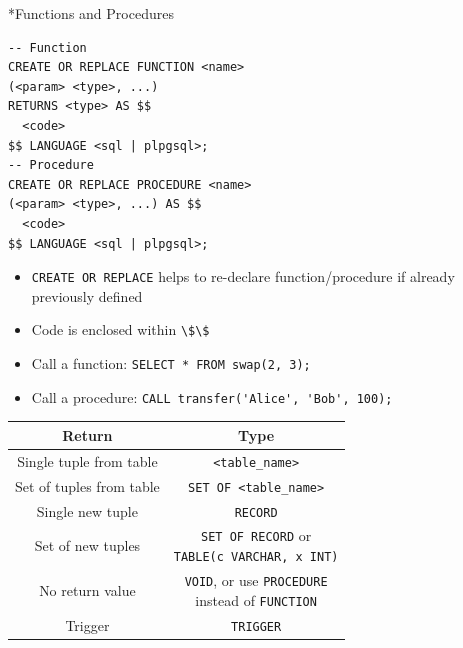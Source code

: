 \documentclass[a4paper]{article}
\makeatletter
\newcommand{\uppercaseandunderline}[1]{\uline{\uppercase{#1}}}
\renewcommand{\section}{
  \@startsection{section}{1}{0pt}{1ex}{1ex} {\raggedleft\normalfont\normalsize\bfseries\uppercaseandunderline}}
\newcommand{\ic}[1]{\lstinline{#1}}
\makeatother
\begin{document}
\begin{multicols}{2}
\section*{Functions and Procedures} \noindent
    \begin{minipage}{0.57\columnwidth}
      \begin{lstlisting}
-- Function
CREATE OR REPLACE FUNCTION <name>
(<param> <type>, ...)
RETURNS <type> AS $$
  <code>
$$ LANGUAGE <sql | plpgsql>;
-- Procedure
CREATE OR REPLACE PROCEDURE <name>
(<param> <type>, ...) AS $$
  <code>
$$ LANGUAGE <sql | plpgsql>;
      \end{lstlisting}
    \end{minipage}
    \begin{minipage}{0.40\columnwidth}
      \begin{itemize}[leftmargin=*]
        \item \ic{CREATE OR REPLACE} helps to re-declare function/procedure if already previously defined
        \item Code is enclosed within \ic{\$\$}
        \item Call a function: \ic{SELECT * FROM swap(2, 3);}
        \item Call a procedure: \ic{CALL transfer('Alice', 'Bob', 100);}
      \end{itemize}
    \end{minipage}
    \begin{center}
      \begin{tabular}{ |c|c| }
        \hline
        \textbf{Return} & \textbf{Type} \\ \hline
        Single tuple from table & \ic{<table_name>} \\ \hline
        Set of tuples from table & \ic{SET OF <table_name>} \\ \hline
        Single new tuple & \ic{RECORD} \\ \hline
        Set of new tuples & \makecell{ \ic{SET OF RECORD} or \\ \ic{TABLE(c VARCHAR, x INT)} } \\ \hline
        No return value & \makecell{ \ic{VOID}, or use \ic{PROCEDURE} \\ instead of \ic{FUNCTION} } \\ \hline
        Trigger & \ic{TRIGGER} \\ \hline
      \end{tabular}
    \end{center}
    \begin{multicols*}{2}

\end{multicols*}
\end{multicols}
\end{document}
